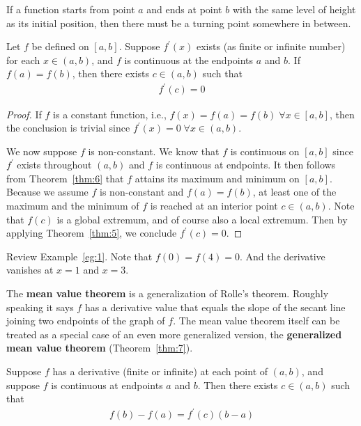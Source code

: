 \documentclass[thmcnt=section, 12pt]{my-elegantbook}
\begin{document}
\par If a function starts from point $a$ and ends at point $b$ with the same level of height as its initial position, then there must be a turning point somewhere in between. 

\begin{theorem}[Rolle] \label{thm:9}
    Let $f$ be defined on $[a, b]$. Suppose $f^\prime(x)$ exists (as finite or infinite number) for each $x \in (a, b)$, and $f$ is continuous at the endpoints $a$ and $b$. If $f(a) = f(b)$, then there exists $c \in (a, b)$ such that 
    \begin{align*}
        f^\prime(c) = 0
    \end{align*}
\end{theorem}

\begin{proof}
    If $f$ is a constant function, i.e., $f(x) = f(a) = f(b) \; \forall x \in [a, b]$, then the conclusion is trivial since $f^\prime(x) = 0 \; \forall x \in (a, b)$.

    We now suppose $f$ is non-constant. We know that $f$ is continuous on $[a, b]$ since $f^\prime$ exists throughout $(a, b)$ and $f$ is continuous at endpoints. It then follows from Theorem~\ref{thm:6} that $f$ attains its maximum and minimum on $[a, b]$. Because we assume $f$ is non-constant and $f(a) = f(b)$, at least one of the maximum and the minimum of $f$ is reached at an interior point $c \in (a, b)$. Note that $f(c)$ is a global extremum, and of course also a local extremum. Then by applying Theorem~\ref{thm:5}, we conclude $f^\prime(c) = 0$.
\end{proof}

\begin{example}
    Review Example~\ref{eg:1}. Note that $f(0) = f(4) = 0$. And the derivative vanishes at $x = 1$ and $x = 3$. 
\end{example}


\par The \textbf{mean value theorem} is a generalization of Rolle's theorem. Roughly speaking it says $f$ has a derivative value that equals the slope of the secant line joining two endpoints of the graph of $f$. The mean value theorem itself can be treated as a special case of an even more generalized version, the \textbf{generalized mean value theorem} (Theorem~\ref{thm:7}).

\begin{theorem} \label{thm:8}
    Suppose $f$ has a derivative (finite or infinite) at each point of $(a, b)$, and suppose $f$ is continuous at endpoints $a$ and $b$. Then there exists $c \in (a, b)$ such that 
    \begin{align*}
        f(b) - f(a) = f^\prime(c) (b - a)
    \end{align*}
\end{theorem}
\end{document}
